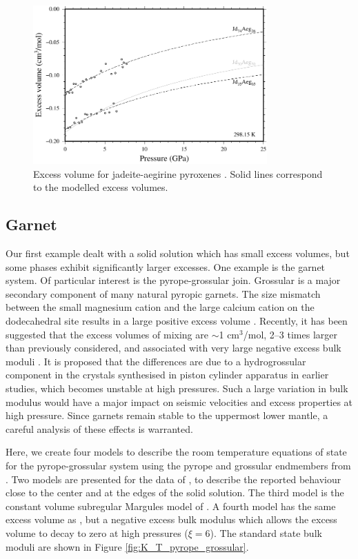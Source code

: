 \documentclass[review]{elsarticle}
\begin{document}
\begin{figure}[ht!]
  \centering
  \includegraphics[width=0.8\textwidth]{figures/jadeite_aegirine_Vex}
  \caption{Excess volume for jadeite-aegirine pyroxenes \citep{NBLBT2006}. Solid lines correspond to the modelled excess volumes.}
  \label{fig:excess_volume_jadeite_aegirine}
\end{figure}

\subsection{Garnet}
Our first example dealt with a solid solution which has small excess volumes, but some phases exhibit significantly larger excesses. One example is the garnet system. Of particular interest is the pyrope-grossular join. Grossular is a major secondary component of many natural pyropic garnets. The size mismatch between the small magnesium cation and the large calcium cation on the dodecahedral site results in a large positive excess volume \citep{NCK1977, BG1997, GCT1996}. Recently, it has been suggested that the excess volumes of mixing are $\sim$1 cm$^3$/mol, 2--3 times larger than previously considered, and associated with very large negative excess bulk moduli \citep{DCW2015}. It is proposed that the differences are due to a hydrogrossular component in the crystals synthesised in piston cylinder apparatus in earlier studies, which becomes unstable at high pressures. Such a large variation in bulk modulus would have a major impact on seismic velocities and excess properties at high pressure. Since garnets remain stable to the uppermost lower mantle, a careful analysis of these effects is warranted.

Here, we create four models to describe the room temperature equations of state for the pyrope-grossular system using the pyrope and grossular endmembers from \cite{HP2011}. Two models are presented for the data of \citep{DCW2015}, to describe the reported behaviour close to the center and at the edges of the solid solution. The third model is the constant volume subregular Margules model of \cite{GCT1996}. A fourth model has the same excess volume as \cite{GCT1996}, but a negative excess bulk modulus which allows the excess volume to decay to zero at high pressures ($\xi=6$). The standard state bulk moduli are shown in Figure \ref{fig:K_T_pyrope_grossular}.
\end{document}
